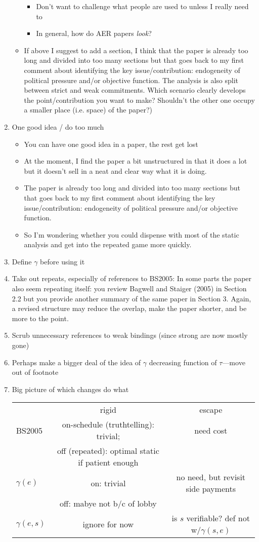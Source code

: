 \documentclass[12pt]{article}
\newcommand{\ga}{\gamma}
\begin{document}
\begin{enumerate}
\begin{itemize}
\begin{itemize}
					\item Don't want to challenge what people are used to unless I really need to
					\item In general, how do AER papers \textit{look}?
				\end{itemize}
			\item If above I suggest to add a section, I think that the paper is already too long and divided into too many sections but that goes back to my first comment about identifying the key issue/contribution: endogeneity of political pressure and/or objective function. The analysis is also split between strict and weak commitments. Which scenario clearly develops the point/contribution you want to make? Shouldn't the other one occupy a smaller place (i.e. space) of the paper?)
		\end{itemize}
		\item One good idea / do too much
		\begin{itemize}
			\item You can have one good idea in a paper, the rest get lost
			\item At the moment, I find the paper a bit unstructured in that it does a lot but it doesn't sell in a neat and clear way what it is doing.
			\item The paper is already too long and divided into too many sections but that goes back to my first comment about identifying the key issue/contribution: endogeneity of political pressure and/or objective function.
			\item So I'm wondering whether you could dispense with most of the static analysis and get into the repeated game more quickly.
		\end{itemize}
	\item Define $\ga$ before using it
	\item Take out repeats, especially of references to BS2005: In some parts the paper also seem repeating itself: you review Bagwell and Staiger (2005) in Section 2.2 but you provide another summary of the same paper in Section 3. Again, a revised structure may reduce the overlap, make the paper shorter, and be more to the point.
	\item Scrub unnecessary references to weak bindings (since strong are now mostly gone)
	\item Perhaps make a bigger deal of the idea of $\ga$ decreasing function of $\tau$---move out of footnote
	\item Big picture of which changes do what \\
		\begin{tabular}{|l|c|c|}
			 & rigid & escape \\
			BS2005  & on-schedule (truthtelling): trivial; & need cost  \\
			 & off (repeated): optimal static if patient enough & \\
			$\ga(e)$ & on: trivial& no need, but revisit side payments\\
			 & off: mabye not b/c of lobby & \\
			$\ga(e,s)$ & ignore for now & is $s$ verifiable? def not w/$\ga(s,e)$
		\end{tabular}
\end{enumerate}
\end{document}

